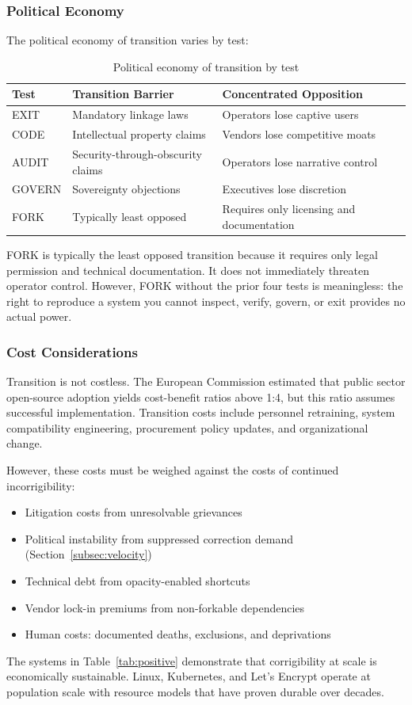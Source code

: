 \subsubsection{Political Economy}

The political economy of transition varies by test:

\begin{table}[h]
\centering
\caption{Political economy of transition by test}
\label{tab:political-economy}
\begin{tabular}{lll}
\hline
\textbf{Test} & \textbf{Transition Barrier} & \textbf{Concentrated Opposition} \\
\hline
EXIT & Mandatory linkage laws & Operators lose captive users \\
CODE & Intellectual property claims & Vendors lose competitive moats \\
AUDIT & Security-through-obscurity claims & Operators lose narrative control \\
GOVERN & Sovereignty objections & Executives lose discretion \\
FORK & Typically least opposed & Requires only licensing and documentation \\
\hline
\end{tabular}
\end{table}

FORK is typically the least opposed transition because it requires only legal permission and technical documentation. It does not immediately threaten operator control. However, FORK without the prior four tests is meaningless: the right to reproduce a system you cannot inspect, verify, govern, or exit provides no actual power.

\subsubsection{Cost Considerations}

Transition is not costless. The European Commission \citep{eu2021oss} estimated that public sector open-source adoption yields cost-benefit ratios above 1:4, but this ratio assumes successful implementation. Transition costs include personnel retraining, system compatibility engineering, procurement policy updates, and organizational change.

However, these costs must be weighed against the costs of continued incorrigibility:

\begin{itemize}
    \item Litigation costs from unresolvable grievances
    \item Political instability from suppressed correction demand (Section~\ref{subsec:velocity})
    \item Technical debt from opacity-enabled shortcuts
    \item Vendor lock-in premiums from non-forkable dependencies
    \item Human costs: documented deaths, exclusions, and deprivations
\end{itemize}

The systems in Table~\ref{tab:positive} demonstrate that corrigibility at scale is economically sustainable. Linux, Kubernetes, and Let's Encrypt operate at population scale with resource models that have proven durable over decades.